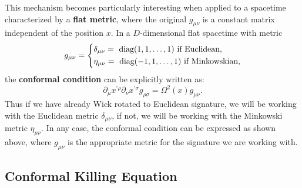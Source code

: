 This mechanism becomes particularly interesting when applied to a spacetime characterized by a \textbf{flat metric}, where the original \(g_{\mu\nu}\) is a constant matrix independent of the position \(x\). In a \(D\)-dimensional flat spacetime with metric
\[
    g_{\mu\nu} = \begin{dcases}
        \delta_{\mu\nu} = \text{ diag}(1,1,\dots,1) \text{ if Euclidean,} \\
        \eta_{\mu\nu} = \text{ diag}(-1,1,\dots,1) \text{ if Minkowskian,}
    \end{dcases}
\]
the \textbf{conformal condition} can be explicitly written as:
\begin{equation}
    \partial_{\mu}x^{\prime\rho}\partial_{\nu}x^{\prime\sigma}g_{\rho\sigma}=\Omega^{2}(x)g_{\mu\nu}.
    \label{eq:conformal_condition}
\end{equation}
Thus if we have already Wick rotated to Euclidean signature, we will be working with the Euclidean metric \(\delta_{\mu\nu}\), if not, we will be working with the Minkowski metric \(\eta_{\mu\nu}\). In any case, the conformal condition can be expressed as shown above, where \(g_{\mu\nu}\) is the appropriate metric for the signature we are working with.

\subsection{Conformal Killing Equation}

